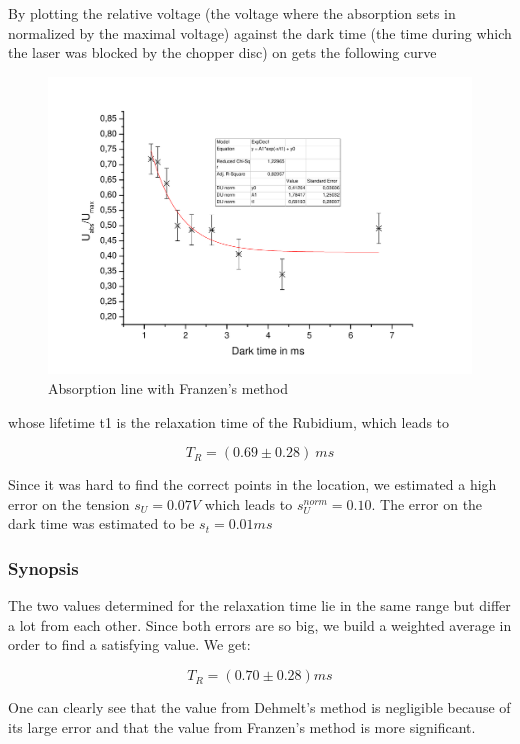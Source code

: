 By plotting the relative voltage (the voltage where the absorption sets in normalized by the maximal voltage) against the dark time (the time during which the laser was blocked by the chopper disc) on gets the following curve

\begin{figure}[H]
\centering \includegraphics[width=\textwidth]{BilderAusw/Franzen.pdf}
\caption{Absorption line with Franzen's method}
\end{figure}

whose lifetime t1 is the relaxation time of the Rubidium, which leads to

$$\boxed{T_R = (0.69 \pm 0.28)\ ms}$$

Since it was hard to find the correct points in the location, we estimated a high error on the tension $s_U = 0.07 V$ which leads to $s_U^{norm} = 0.10$. The error on the dark time was estimated to be $s_t = 0.01 ms$

\subsubsection{Synopsis}

The two values determined for the relaxation time lie in the same range but differ a lot from each other. Since both errors are so big, we build a weighted average in order to find a satisfying value. We get:

$$\boxed{T_R = (0.70 \pm 0.28) ms}$$

One can clearly see that the value from Dehmelt's method is negligible because of its large error and that the value from Franzen's method is more significant.













